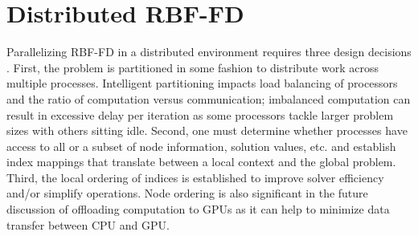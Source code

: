 \documentclass{report}
\begin{document}
%
%








\chapter{Distributed RBF-FD}
\label{chap:distributed_rbffd}



Parallelizing RBF-FD in a distributed environment requires three
design decisions \cite{Saad2003}. First, the problem is partitioned in some fashion to distribute work across multiple processes. Intelligent partitioning
impacts load balancing of processors and the ratio of computation versus communication; imbalanced computation can result in excessive delay per
iteration as some processors tackle larger problem sizes with others sitting idle. Second, one must determine whether processes have access to all or a subset of node information,
solution values, etc. and establish index mappings that translate between a local context and the global problem. Third, the local ordering of indices is established to improve solver efficiency and/or simplify operations. Node
ordering is also significant in the future discussion of offloading computation to GPUs as it can help to minimize data transfer between CPU and GPU. 
\end{document}
